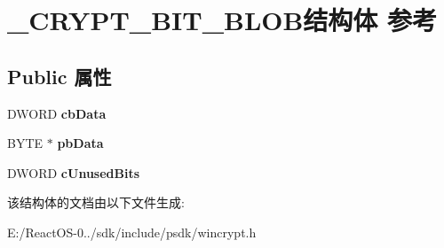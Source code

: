\hypertarget{struct___c_r_y_p_t___b_i_t___b_l_o_b}{}\section{\+\_\+\+C\+R\+Y\+P\+T\+\_\+\+B\+I\+T\+\_\+\+B\+L\+O\+B结构体 参考}
\label{struct___c_r_y_p_t___b_i_t___b_l_o_b}
\subsection*{Public 属性}
\begin{DoxyCompactItemize}
\item 
\mbox{\label{struct___c_r_y_p_t___b_i_t___b_l_o_b_abb0ce208ffb1d7acd1a189f4a48e5678}} 
D\+W\+O\+RD {\bfseries cb\+Data}
\item 
\mbox{\label{struct___c_r_y_p_t___b_i_t___b_l_o_b_aaea193e921c6c8bb54e4d3da32f7adee}} 
B\+Y\+TE $\ast$ {\bfseries pb\+Data}
\item 
\mbox{\label{struct___c_r_y_p_t___b_i_t___b_l_o_b_a3157f3250663e0334ad7776b02e937a1}} 
D\+W\+O\+RD {\bfseries c\+Unused\+Bits}
\end{DoxyCompactItemize}


该结构体的文档由以下文件生成\+:\begin{DoxyCompactItemize}
\item 
E\+:/\+React\+O\+S-\/0../sdk/include/psdk/wincrypt.\+h\end{DoxyCompactItemize}

